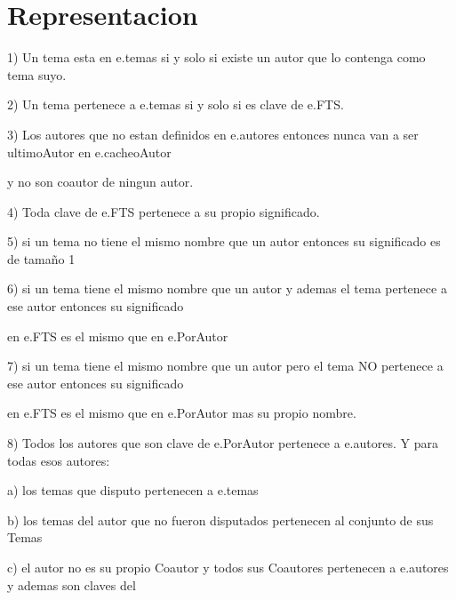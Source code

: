 \documentclass{article}
\begin{document}
\section*{Representacion}


\hspace{1cm}1) Un tema esta en e.temas si y solo si existe un autor que lo contenga como tema suyo. 

\hspace{0.5cm}2) Un tema pertenece a e.temas si y solo si es clave de e.FTS.

\hspace{0.5cm}3) Los autores que no estan definidos en e.autores entonces nunca van a ser ultimoAutor en e.cacheoAutor

\hspace{0.5cm} y no son coautor de ningun autor.

\hspace{0.5cm}4) Toda clave de e.FTS pertenece a su propio significado.

\hspace{0.5cm}5) si un tema no tiene el mismo nombre que un autor entonces su significado es de tamaño 1

\hspace{0.5cm}6) si un tema tiene el mismo nombre que un autor y ademas el tema pertenece a ese autor entonces su significado

\hspace{0.5cm} en e.FTS es el mismo que en e.PorAutor 

\hspace{0.5cm}7) si un tema tiene el mismo nombre que un autor pero el tema NO pertenece a ese autor entonces su significado

\hspace{0.5cm} en e.FTS es el mismo que en e.PorAutor mas su propio nombre.

\hspace{0.5cm}8) Todos los autores que son clave de e.PorAutor pertenece a e.autores. Y para todas esos autores: 

\hspace{1cm} a) los temas que disputo pertenecen a e.temas

\hspace{1cm} b) los temas del autor que no fueron disputados pertenecen al conjunto de sus Temas 

\hspace{1cm} c) el autor no es su propio Coautor y todos sus Coautores pertenecen a e.autores y ademas son claves del
\end{document}
